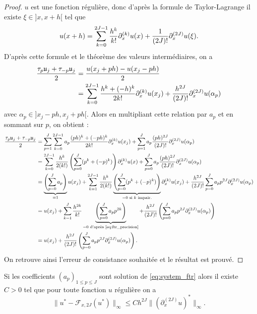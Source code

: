 \begin{proof}
$u$ est une fonction régulière, donc d'après la formule de Taylor-Lagrange il existe $\xi \in ]x,x+h[$ tel que
\begin{equation}
u(x+h) = \displaystyle\sum\limits_{k=0}^{2J-1} \dfrac{h^k}{k!} \partial_x^{(k)} u(x) +\dfrac{1}{(2J)!} \partial_x^{(2J)}u(\xi).
\end{equation}
D'après cette formule et le théorème des valeurs intermédiaires, on a
\begin{align*}
\dfrac{\tau_p \mathfrak{u}_j + \tau_{-p} \mathfrak{u}_j}{2} & = \dfrac{u(x_j + ph) - u(x_j-ph)}{2} \\
& = \displaystyle\sum\limits_{k=0}^{2J-1} \dfrac{h^k + (-h)^k}{2k!} \partial_x^{(k)}u(x_j) + \dfrac{h^{2J}}{(2J)!} \partial_x^{(2J)} u(\alpha_p)
\end{align*}
avec $\alpha_p \in ]x_j - ph, x_j + ph[$. Alors en multipliant cette relation par $a_p$ et en sommant sur $p$, on obtient :
\begin{align*}
\dfrac{\tau_p \mathfrak{u}_j + \tau_{-p} \mathfrak{u}_j}{2} & = \displaystyle\sum\limits_{p=1}^J \displaystyle\sum\limits_{k=0}^{2J-1} a_p \dfrac{(ph)^k + (-ph)^k}{2k!} \partial_x^{(k)}u(x_j) + \displaystyle\sum\limits_{p=1}^J a_p \dfrac{(ph)^{2J}}{(2J)!} \partial_x^{(2J)}u(\alpha_p) \\
& = \displaystyle\sum\limits_{k=0}^{2J-1} \dfrac{h^k}{2 (k!)} \left( \displaystyle\sum\limits_{p=0}^J (p^k + (-p)^k) \right) \partial_x^{(k)} u(x) + \displaystyle\sum\limits_{p=0}^J a_p \dfrac{(ph)^{2J}}{(2J)!} \partial_x^{(2J)}u(\alpha_p) \\
& = \underbrace{ \left( \displaystyle\sum\limits_{p=0}^J a_p \right)}_{=1}u(x_j) + 
\displaystyle\sum\limits_{k=1}^{2J-1} \dfrac{h^k}{2(k!)} \underbrace{\left( \displaystyle\sum\limits_{p=0}^J (p^k + (-p)^k)  \right)}_{=0 \text{ si } k \text{ impair.}} \partial_x^{(k)}u(x_j) + \dfrac{h^{2J}}{(2J)!} \displaystyle\sum\limits_{p=0}^Ja_p p^{2J} \partial_x^{(2J)}u(\alpha_p)  \\
& = u(x_j) + \displaystyle\sum\limits_{k=1}^J \dfrac{h^{2k}}{k!} \underbrace{\left( \displaystyle\sum\limits_{p=0}^J a_p p^{2k} \right)}_{ = 0 \text{ d'après \eqref{eq:ftr_precision}}}
+ \dfrac{h^{2J}}{(2J)!} \left( \displaystyle\sum\limits_{p=0}^J a_p p^{2J} \partial_x^{(2J)}u(\alpha_p) \right) \\
& = u(x_j) + \dfrac{h^{2J}}{(2J)!} \left( \displaystyle\sum\limits_{p=0}^J a_p p^{2J} \partial_x^{(2J)}u(\alpha_p) \right).
\end{align*}
On retrouve ainsi l'erreur de consistance souhaitée et le résultat est prouvé.
\end{proof}

\begin{corollaire}
Si les coefficients $(a_p)_{1 \leq p \leq J}$ sont solution de \eqref{eq:system_ftr} alors il existe $C>0$ tel que pour toute fonction $u$ régulière on a 
\begin{equation}
\| u^* -  \mathcal{F}_{x,2J}(u^*) \|_{\infty} \leq C h^{2J} \| (\partial_x^{(2J)}u)^* \|_{\infty}.
\end{equation}
\end{corollaire}

